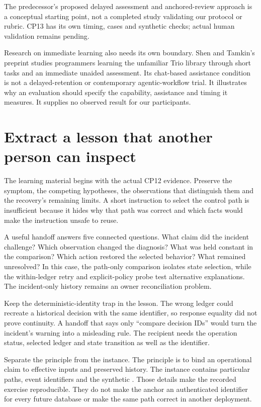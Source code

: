 The predecessor's proposed delayed assessment and anchored-review approach is a conceptual starting point, not a completed study validating our protocol or rubric.\autocite{papaliniNDSE2} CP13 has its own timing, cases and synthetic checks; actual human validation remains pending.

Research on immediate learning also needs its own boundary. Shen and Tamkin's preprint studies programmers learning the unfamiliar Trio library through short tasks and an immediate unaided assessment. Its chat-based assistance condition is not a delayed-retention or contemporary agentic-workflow trial.\autocite{shenTamkinSkills2026} It illustrates why an evaluation should specify the capability, assistance and timing it measures. It supplies no observed result for our participants.

\section{Extract a lesson that another person can inspect}\label{sec:ch13-handoff}

The learning material begins with the actual CP12 evidence. Preserve the symptom, the competing hypotheses, the observations that distinguish them and the recovery's remaining limits. A short instruction to select the control path is insufficient because it hides why that path was correct and which facts would make the instruction unsafe to reuse.

A useful handoff answers five connected questions. What claim did the incident challenge? Which observation changed the diagnosis? What was held constant in the comparison? Which action restored the selected behavior? What remained unresolved? In this case, the path-only comparison isolates state selection, while the within-ledger retry and explicit-policy probe test alternative explanations. The incident-only history remains an owner reconciliation problem.

Keep the deterministic-identity trap in the lesson. The wrong ledger could recreate a historical decision with the same identifier, so response equality did not prove continuity. A handoff that says only \enquote{compare decision IDs} would turn the incident's warning into a misleading rule. The recipient needs the operation status, selected ledger and state transition as well as the identifier.

Separate the principle from the instance. The principle is to bind an operational claim to effective inputs and preserved history. The instance contains particular paths, event identifiers and the synthetic . Those details make the recorded exercise reproducible. They do not make the anchor an authenticated identifier for every future database or make the same path correct in another deployment.

